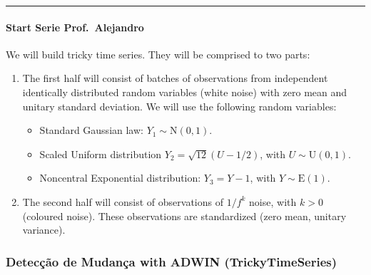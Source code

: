 \documentclass[
]{article}
\begin{document}
\begin{center}\rule{0.5\linewidth}{0.5pt}\end{center}

\hypertarget{start-serie-prof.-alejandro}{%
\paragraph{Start Serie
Prof.~Alejandro}\label{start-serie-prof.-alejandro}}

We will build tricky time series. They will be comprised to two parts:

\begin{enumerate}
\item The first half will consist of batches of observations from independent identically distributed random variables (white noise) with zero mean and unitary standard deviation.
We will use the following random variables:
  \begin{itemize}
  \item Standard Gaussian law: $Y_1\sim\text{N}(0,1)$.
  \item Scaled Uniform distribution $Y_2=\sqrt{12}(U-1/2)$, with $U\sim\text{U}(0,1)$.
  \item Noncentral Exponential distribution: $Y_3=Y-1$, with $Y\sim\text{E}(1)$.
  \end{itemize}
\item The second half will consist of observations of $1/f^k$ noise, with $k>0$ (coloured noise). These observations are standardized (zero mean, unitary variance).
\end{enumerate}

\hypertarget{detecuxe7uxe3o-de-mudanuxe7a-with-adwin-trickytimeseries}{%
\subsubsection{Detecção de Mudança with ADWIN
(TrickyTimeSeries)}\label{detecuxe7uxe3o-de-mudanuxe7a-with-adwin-trickytimeseries}}
\end{document}
